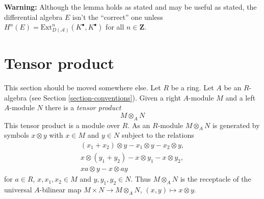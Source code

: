 \noindent
{\bf Warning:} Although the lemma holds as stated and may be useful
as stated, the differential algebra $E$ isn't the ``correct'' one unless
$H^n(E) = \text{Ext}^n_{D(\mathcal{A})}(K^\bullet, K^\bullet)$
for all $n \in \mathbf{Z}$.




\section{Tensor product}
\label{section-tensor-product}

\noindent
This section should be moved somewhere else. Let $R$ be a ring.
Let $A$ be an $R$-algebra (see Section \ref{section-conventions}).
Given a right $A$-module $M$ and a left $A$-module $N$ there is
a {\it tensor product}
$$
M \otimes_A N
$$
This tensor product is a module over $R$. As an $R$-module $M \otimes_A N$
is generated by symbols $x \otimes y$ with $x \in M$ and $y \in N$ subject
to the relations
$$
\begin{matrix}
(x_1 + x_2) \otimes y - x_1 \otimes y - x_2 \otimes y, \\
x \otimes (y_1 + y_2) - x \otimes y_1 - x \otimes y_2, \\
xa \otimes y - x \otimes ay
\end{matrix}
$$
for $a \in R$, $x, x_1, x_2 \in M$
and $y, y_1, y_2 \in N$. Thus $M \otimes_A N$ is the receptacle
of the universal $A$-bilinear map $M \times N \to M \otimes_A N$,
$(x, y) \mapsto x \otimes y$.

